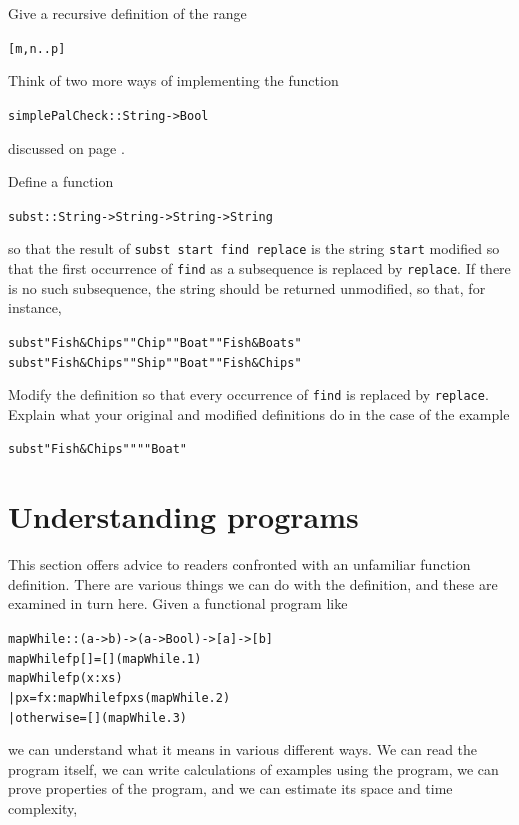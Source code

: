 \begin{exercises}


\item
Give a recursive definition of the range
\begin{alltt}
[m,n .. p]
\end{alltt}

\item
Think of two more ways of implementing the function
\begin{alltt}
simplePalCheck :: String -> Bool
\end{alltt}
discussed on page \pageref{simplePalCheck}.

\item
Define a function 
\begin{alltt}
subst :: String -> String -> String ->  String
\end{alltt}
so that the result of \texttt{subst start find replace} is the string
\texttt{start}
modified so that the first occurrence of \texttt{find} as a subsequence
is replaced by \texttt{replace}. If there is no such subsequence, the
string should be returned unmodified, so that, for instance,
\begin{alltt}
subst "Fish \& Chips" "Chip" "Boat" \step "Fish \& Boats"
subst "Fish \& Chips" "Ship" "Boat" \step "Fish \& Chips"
\end{alltt}
Modify the definition so that every occurrence of \texttt{find} is
replaced by \texttt{replace}.
Explain what your original and modified definitions do in the case of the example 
\begin{alltt}
subst "Fish \& Chips" "" "Boat"
\end{alltt}
\end{exercises}

\section{Understanding programs}
\label{understanding}

This section offers advice to readers confronted with an 
unfamiliar function definition. There are various things we can do 
with the definition, and these are examined in turn here.
Given a functional program like
\begin{alltt}
mapWhile :: (a -> b) -> (a -> Bool) -> [a] -> [b]
\bl
mapWhile f p []    = [] \hfill (mapWhile.1)
mapWhile f p (x:xs)
  | p x            = f x : mapWhile f p xs \hfill (mapWhile.2)
  | otherwise      = [] \hfill (mapWhile.3)
\end{alltt}
we can understand what it means in various different ways. We can read
the program itself, we can write calculations of examples using
the program, we can prove properties of the program, and we can
estimate its space and time complexity,

